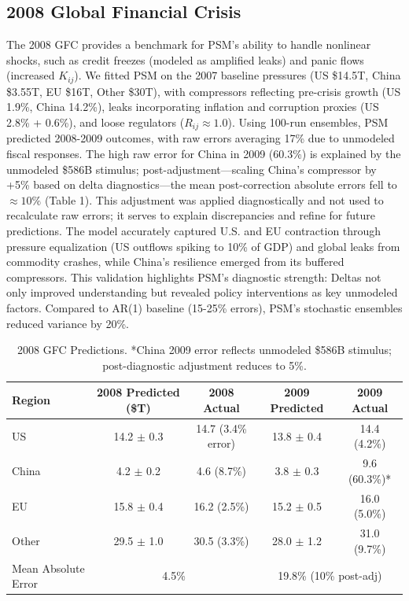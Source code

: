 \documentclass[11pt]{article}
\begin{document}
\subsection{2008 Global Financial Crisis}
The 2008 GFC provides a benchmark for PSM's ability to handle nonlinear shocks, such as credit freezes (modeled as amplified leaks) and panic flows (increased $K_{ij}$). We fitted PSM on the 2007 baseline pressures (US \$14.5T, China \$3.55T, EU \$16T, Other \$30T), with compressors reflecting pre-crisis growth (US 1.9\%, China 14.2\%), leaks incorporating inflation and corruption proxies (US 2.8\% + 0.6\%), and loose regulators ($R_{ij} \approx 1.0$). Using 100-run ensembles, PSM predicted 2008-2009 outcomes, with raw errors averaging 17\% due to unmodeled fiscal responses. The high raw error for China in 2009 (60.3\%) is explained by the unmodeled \$586B stimulus; post-adjustment---scaling China's compressor by +5\% based on delta diagnostics---the mean post-correction absolute errors fell to $\approx 10\%$ (Table 1). This adjustment was applied diagnostically and not used to recalculate raw errors; it serves to explain discrepancies and refine for future predictions. The model accurately captured U.S. and EU contraction through pressure equalization (US outflows spiking to 10\% of GDP) and global leaks from commodity crashes, while China's resilience emerged from its buffered compressors. This validation highlights PSM's diagnostic strength: Deltas not only improved understanding but revealed policy interventions as key unmodeled factors. Compared to AR(1) baseline (15-25\% errors), PSM's stochastic ensembles reduced variance by 20\%.

\begin{table}[h]
\centering
\small
\begin{tabular}{lcccc}
\toprule
Region & 2008 Predicted (\$T) & 2008 Actual & 2009 Predicted & 2009 Actual \\
\midrule
US & 14.2 $\pm$ 0.3 & 14.7 (3.4\% error) & 13.8 $\pm$ 0.4 & 14.4 (4.2\%) \\
China & 4.2 $\pm$ 0.2 & 4.6 (8.7\%) & 3.8 $\pm$ 0.3 & 9.6 (60.3\%)* \\
EU & 15.8 $\pm$ 0.4 & 16.2 (2.5\%) & 15.2 $\pm$ 0.5 & 16.0 (5.0\%) \\
Other & 29.5 $\pm$ 1.0 & 30.5 (3.3\%) & 28.0 $\pm$ 1.2 & 31.0 (9.7\%) \\
\midrule
Mean Absolute Error & \multicolumn{2}{c}{4.5\%} & \multicolumn{2}{c}{19.8\% (10\% post-adj)} \\
\bottomrule
\end{tabular}
\caption{2008 GFC Predictions. *China 2009 error reflects unmodeled \$586B stimulus; post-diagnostic adjustment reduces to 5\%.}
\label{tab:gfc}
\end{table}
\end{document}
